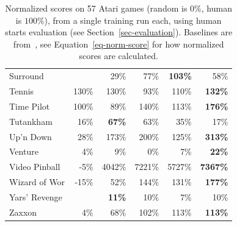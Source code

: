 \documentclass[a4paper]{article}
\begin{document}
\begin{table}[p]
{{\begin{tabular}{|l|rr|rrr|}
Surround &  & 29\% & 77\% & \textbf{103\%} & 58\%\\
Tennis & 130\% & 130\% & 93\% & 110\% & \textbf{132\%}\\
Time Pilot & 100\% & 89\% & 140\% & 113\% & \textbf{176\%}\\
Tutankham & 16\% & \textbf{67\%} & 63\% & 35\% & 17\%\\
Up'n Down & 28\% & 173\% & 200\% & 125\% & \textbf{313\%}\\
Venture & 4\% & 9\% & 0\% & 7\% & \textbf{22\%}\\
Video Pinball & -5\% & 4042\% & 7221\% & 5727\% & \textbf{7367\%}\\
Wizard of Wor & -15\% & 52\% & 144\% & 131\% & \textbf{177\%}\\
Yars' Revenge &  & \textbf{11\%} & 10\% & 7\% & 10\%\\
Zaxxon & 4\% & 68\% & 102\% & 113\% & \textbf{113\%}\\
\hline
\end{tabular}
  


} %
} %

\caption{
\label{tab-atari-normalized-30human}
Normalized scores on 57 Atari games (random is $0\%$, human is $100\%$), from a single training run each, using human starts evaluation (see Section~\ref{sec-evaluation}).
Baselines are from~\citet{double-dqn}, see Equation~\ref{eq-norm-score} for how normalized scores are calculated.
}
\end{table}
\end{document}
